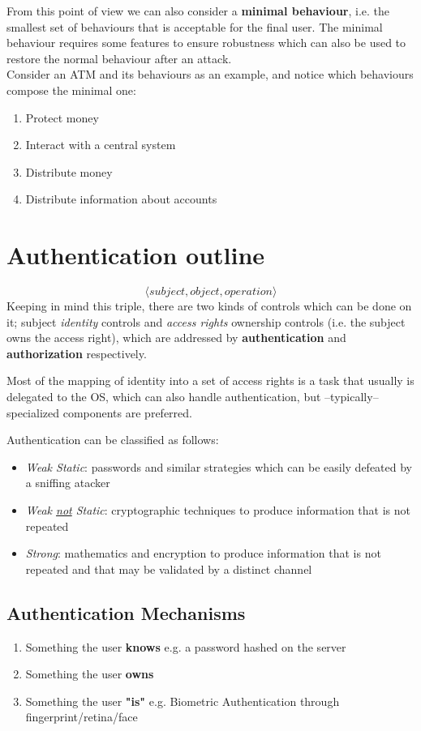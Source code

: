 From this point of view we can also consider a \textbf{minimal behaviour},
i.e. the smallest set of behaviours that is acceptable for the final user.
The minimal behaviour requires some features to ensure robustness which can also be used to restore the normal behaviour after an attack.\\
Consider an ATM and its behaviours as an example, and notice which behaviours compose the {\color{red} minimal} one:
\begin{enumerate}
    \item {\color{red} Protect money}
    \item {\color{red} Interact with a central system}
    \item Distribute money
    \item Distribute information about accounts
\end{enumerate}

\section{Authentication outline}
\[\langle subject, object, operation \rangle\]
Keeping in mind this triple, there are two kinds of controls which can be done on it; subject \textit{identity} controls and \textit{access rights} ownership controls (i.e. the subject owns the access right), 
which are addressed by \textbf{authentication} and \textbf{authorization} respectively.

Most of the mapping of identity into a set of access rights is a task that usually is delegated to the OS,
which can also handle authentication,
but {--}typically{--} specialized components are preferred.

Authentication can be classified as follows:
\begin{itemize}
    \item \textit{Weak Static}: passwords and similar strategies which can be easily defeated by a sniffing atacker
    \item \textit{Weak \ul{not} Static}: cryptographic techniques to produce information that is not repeated
    \item \textit{Strong}: mathematics and encryption to produce information
    that is not repeated and that may be validated by a distinct
    channel
\end{itemize}

\subsection{Authentication Mechanisms}
\begin{enumerate}
    \item Something the user \textbf{knows} e.g. a password hashed on the server
    \item Something the user \textbf{owns}
    \item Something the user \textbf{"is"} e.g. Biometric Authentication through fingerprint/retina/face
\end{enumerate}

